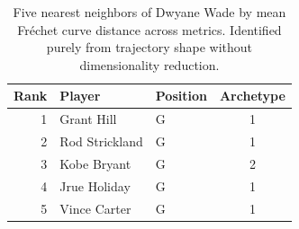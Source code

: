 \begin{table}[htbp]
  \centering\small
  \begin{tabular}{rllc}
    \toprule
    Rank & Player & Position & Archetype \\
    \midrule
    1 & Grant Hill & G & 1 \\
    2 & Rod Strickland & G & 1 \\
    3 & Kobe Bryant & G & 2 \\
    4 & Jrue Holiday & G & 1 \\
    5 & Vince Carter & G & 1 \\
    \bottomrule
  \end{tabular}
  \caption{Five nearest neighbors of Dwyane Wade by mean Fr\'{e}chet curve distance across metrics. Identified purely from trajectory shape without dimensionality reduction.}
  \label{tab:Dwyane_Wade_frechet_curve_neighbors}
\end{table}

